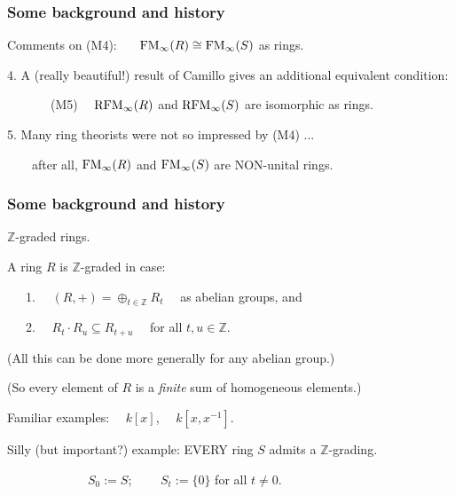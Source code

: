 \documentclass{beamer}
\begin{document}
\begin{frame}
\frametitle{Some background and history}
\footnotesize
\begin{center}
Comments on (M4):
  \ \ \   ${\rm FM}_\infty(R) \cong {\rm FM}_\infty(S)$ as rings.  
  \end{center}
\normalsize

\medskip


4.      A (really beautiful!) result of Camillo gives an additional equivalent condition:

\medskip

\ \ \ \ \ \ \ (M5)   \ \  ${\rm RFM}_\infty(R)$ and ${\rm RFM}_\infty(S)$  are isomorphic as rings.   

\bigskip
\medskip
\pause

5.  Many ring theorists were not so impressed by (M4)   ... 

\medskip

\ \ \ \ after all, ${\rm FM}_\infty(R)$ and ${\rm FM}_\infty(S)$ are NON-unital rings.   

\end{frame}





\begin{frame}
\frametitle{Some background and history}

 
$\mathbb{Z}$-graded  rings.

\bigskip

A ring $R$ is $\mathbb{Z}$-graded  in case:

\medskip

\ \ \ 1. \ \ $(R,+)  = \oplus_{t\in \mathbb{Z}} R_t$  \ \  as abelian groups,  and 

\medskip

\ \ \ 2.  \ \ $R_t \cdot R_u \subseteq R_{t+u}$ \ \  for all $t,u \in \mathbb{Z}$.  


\bigskip
\pause

\footnotesize

(All this can be done more generally for any abelian group.)

\smallskip

\pause

(So every element of $R$ is a {\it finite} sum of homogeneous elements.) 

\normalsize

\pause
\bigskip

Familiar examples:   \ \   $k[x]$,   \pause  \ \ $k[x,x^{-1}]$.   

\bigskip
\pause

Silly (but important?) example:   EVERY ring $S$ admits a $\mathbb{Z}$-grading.

\medskip

\ \ \ \ \ \ \ \ \ \ \ \ \ $S_0 := S$; \ \ \  \ $S_t := \{0\}$ for all $t\neq 0$.  


\end{frame}
\end{document}
